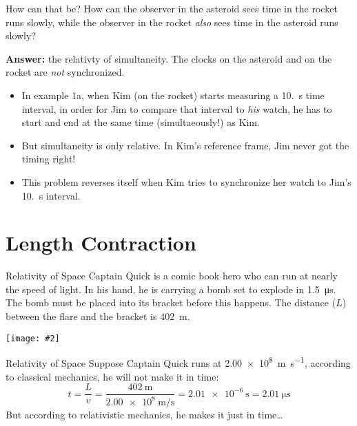 \documentclass[12pt,compress,aspectratio=169]{beamer}
\newcommand{\pic}[2]{\texttt{[image: \#2]}}
\begin{document}
\begin{frame}{How can that be?}
  How can the observer in the asteroid sees time in the rocket runs slowly,
  while the observer in the rocket \emph{also} sees time in the asteroid runs
  slowly?

  \vspace{.3in}\textbf{Answer:} the relativty of simultaneity. The clocks on the
  asteroid and on the rocket are \emph{not} synchronized.
  \begin{itemize}
  \item In example 1a, when Kim (on the rocket) starts measuring a
    \SI{10.}{\second} time interval, in order for Jim to compare that interval
    to \emph{his} watch, he has to start and end at the same time
    (simultaeously!) as Kim.
  \item But simultaneity is only relative. In Kim's reference frame, Jim never
    got the timing right!
  \item This problem reverses itself when Kim tries to synchronize her watch to
    Jim's \SI{10.}{\second} interval.
  \end{itemize}
\end{frame}


\section{Length Contraction}

\begin{frame}{Relativity of Space}
  Captain Quick is a comic book hero who can run at nearly the speed of light.
  In his hand, he is carrying a bomb set to explode in \SI{1.5}{\micro\second}.
  The bomb must be placed into its bracket before this happens. The distance
  ($L$) between the flare and the bracket is \SI{402}{\metre}.
  \begin{center}
    \pic{.7}{graphics/captain-quick}
  \end{center}
\end{frame}


\begin{frame}{Relativity of Space}
  Suppose Captain Quick runs at \SI{2.00e8}{\metre\per\second}, according to
  classical mechanics, he will not make it in time:
  \begin{displaymath}
    t= \frac{L}{v}=\frac{\SI{402}{\metre}}{\SI{2.00e8}{\metre\per\second}}
    =\SI{2.01e-6}{\second}=\SI{2.01}{\micro\second}
  \end{displaymath}
  But according to relativistic mechanics, he makes it just in time\ldots
\end{frame}
\end{document}
